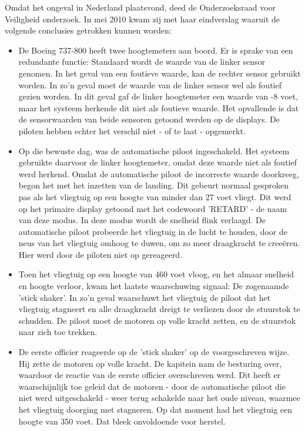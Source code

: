 \documentclass{article}
\begin{document}
					Omdat het ongeval in Nederland plaatsvond, deed de Onderzoeksraad voor Veiligheid onderzoek. In mei 2010 kwam zij met haar eindverslag waaruit de volgende conclusies getrokken kunnen worden: \cite{OvV2009} \par
				
				\begin{itemize}

					\item De Boeing 737-800 heeft twee hoogtemeters aan boord. Er is sprake van een redundante functie: Standaard wordt de waarde van de linker sensor genomen. In het geval van een foutieve waarde, kan de rechter sensor gebruikt worden. In zo'n geval moet de waarde van de linker sensor wel als foutief gezien worden. In dit geval gaf de linker hoogtemeter een waarde van -8 voet, maar het systeem herkende dit niet als foutieve waarde. Het opvallende is dat de sensorwaarden van beide sensoren getoond werden op de displays. De piloten hebben echter het verschil niet - of te laat - opgemerkt.

					\item Op die bewuste dag, was de automatische piloot ingeschakeld. Het systeem gebruikte daarvoor de linker hoogtemeter, omdat deze waarde niet als foutief werd herkend. Omdat de automatische piloot de incorrecte waarde doorkreeg, begon het met het inzetten van de landing. Dit gebeurt normaal gesproken pas als het vliegtuig op een hoogte van minder dan 27 voet vliegt. Dit werd op het primaire display getoond met het codewoord 'RETARD' - de naam van deze modus. In deze modus wordt de snelheid flink verlaagd. De automatische piloot probeerde het vliegtuig in de lucht te houden, door de neus van het vliegtuig omhoog te duwen, om zo meer draagkracht te creeëren. Hier werd door de piloten niet op gereageerd.

					\item Toen het vliegtuig op een hoogte van 460 voet vloog, en het almaar snelheid en hoogte verloor, kwam het laatste waarschuwing signaal: De zogenaamde 'stick shaker'. In zo'n geval waarschuwt het vliegtuig de piloot dat het vliegtuig stagneert en alle draagkracht dreigt te verliezen door de stuurstok te schudden. De piloot moet de motoren op volle kracht zetten, en de stuurstok naar zich toe trekken.

					\item De eerste officier reageerde op de 'stick shaker' op de voorgeschreven wijze. Hij zette de motoren op volle kracht. De kapitein nam de besturing over, waardoor de reactie van de eerste officier overschreven werd. Dit heeft er waarschijnlijk toe geleid dat de motoren - door de automatische piloot die niet werd uitgeschakeld - weer terug schakelde naar het oude niveau, waarmee het vliegtuig doorging met stagneren. Op dat moment had het vliegtuig een hoogte van 350 voet. Dat bleek onvoldoende voor herstel.


\end{itemize}
\end{document}

